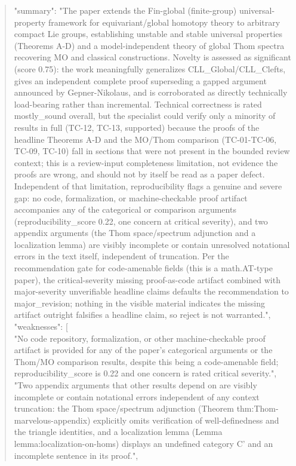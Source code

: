 \documentclass[11pt]{article}
\begin{document}
\begin{quote}
  "summary": "The paper extends the Fin-global (finite-group) universal-property framework for equivariant/global homotopy theory to arbitrary compact Lie groups, establishing unstable and stable universal properties (Theorems A-D) and a model-independent theory of global Thom spectra recovering MO and classical constructions. Novelty is assessed as significant (score 0.75): the work meaningfully generalizes CLL\_Global/CLL\_Clefts, gives an independent complete proof superseding a gapped argument announced by Gepner-Nikolaus, and is corroborated as directly technically load-bearing rather than incremental. Technical correctness is rated mostly\_sound overall, but the specialist could verify only a minority of results in full (TC-12, TC-13, supported) because the proofs of the headline Theorems A-D and the MO/Thom comparison (TC-01-TC-06, TC-09, TC-10) fall in sections that were not present in the bounded review context; this is a review-input completeness limitation, not evidence the proofs are wrong, and should not by itself be read as a paper defect. Independent of that limitation, reproducibility flags a genuine and severe gap: no code, formalization, or machine-checkable proof artifact accompanies any of the categorical or comparison arguments (reproducibility\_score 0.22, one concern at critical severity), and two appendix arguments (the Thom space/spectrum adjunction and a localization lemma) are visibly incomplete or contain unresolved notational errors in the text itself, independent of truncation. Per the recommendation gate for code-amenable fields (this is a math.AT-type paper), the critical-severity missing proof-as-code artifact combined with major-severity unverifiable headline claims defaults the recommendation to major\_revision; nothing in the visible material indicates the missing artifact outright falsifies a headline claim, so reject is not warranted.",\\
  "weaknesses": [\\
    "No code repository, formalization, or other machine-checkable proof artifact is provided for any of the paper's categorical arguments or the Thom/MO comparison results, despite this being a code-amenable field; reproducibility\_score is 0.22 and one concern is rated critical severity.",\\
    "Two appendix arguments that other results depend on are visibly incomplete or contain notational errors independent of any context truncation: the Thom space/spectrum adjunction (Theorem thm:Thom-marvelous-appendix) explicitly omits verification of well-definedness and the triangle identities, and a localization lemma (Lemma lemma:localization-on-homs) displays an undefined category C' and an incomplete sentence in its proof.",\\

\end{quote}
\end{document}
